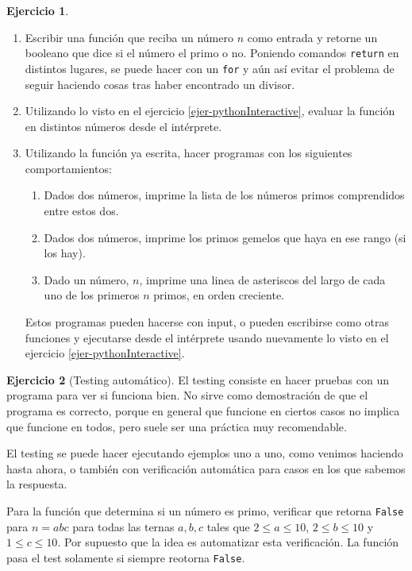 \documentclass[a4paper,12pt]{book}
\theoremstyle{definition}
\newtheorem{ejercicio}{Ejercicio}
\begin{document}
	\begin{ejercicio}
		\begin{enumerate}
			\item Escribir una función que reciba un número $n$ como entrada y retorne un booleano que dice si el número el primo o no. Poniendo comandos {\tt return} en distintos lugares, se puede hacer con un {\tt for} y aún así evitar el problema de seguir haciendo cosas tras haber encontrado un divisor.
			\item Utilizando lo visto en el ejercicio \ref{ejer-pythonInteractive}, evaluar la función en distintos números desde el intérprete.
			\item Utilizando la función ya escrita, hacer programas con los siguientes comportamientos:
			\begin{enumerate}
				\item Dados dos números, imprime la lista de los números primos comprendidos entre estos dos.
				\item Dados dos números, imprime los primos gemelos que haya en ese rango (si los hay).
				\item Dado un número, $n$, imprime una linea de asteriscos del largo de cada uno de los primeros $n$ primos, en orden creciente.
			\end{enumerate}
			Estos programas pueden hacerse con input, o pueden escribirse como otras funciones y ejecutarse desde el intérprete usando nuevamente lo visto en el ejercicio \ref{ejer-pythonInteractive}.
		\end{enumerate}
	\end{ejercicio}
	\begin{ejercicio}[Testing automático]
		El testing consiste en hacer pruebas con un programa para ver si funciona bien. No sirve como demostración de que el programa es correcto, porque en general que funcione en ciertos casos no implica que funcione en todos, pero suele ser una práctica muy recomendable.
		
		El testing se puede hacer ejecutando ejemplos uno a uno, como venimos haciendo hasta ahora, o también con verificación automática para casos en los que sabemos la respuesta.
		
		Para la función que determina si un número es primo, verificar que retorna {\tt False} para $n=abc$ para todas las ternas $a,b,c$ tales que $2\leq a\leq 10$, $2\leq b\leq 10$ y $1\leq c\leq 10$. Por supuesto que la idea es automatizar esta verificación. La función pasa el test solamente si siempre reotorna {\tt False}.
	\end{ejercicio}
	
\end{document}
